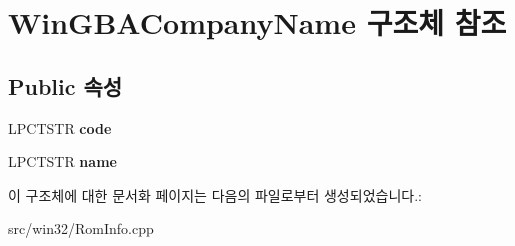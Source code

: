 \hypertarget{struct_win_g_b_a_company_name}{}\section{Win\+G\+B\+A\+Company\+Name 구조체 참조}
\label{struct_win_g_b_a_company_name}
\subsection*{Public 속성}
\begin{DoxyCompactItemize}
\item 
\mbox{\label{struct_win_g_b_a_company_name_a8c8a9f3a68535b96bae0b3c1734a1696}} 
L\+P\+C\+T\+S\+TR {\bfseries code}
\item 
\mbox{\label{struct_win_g_b_a_company_name_a61746fed679453b425013ae539c4c3a7}} 
L\+P\+C\+T\+S\+TR {\bfseries name}
\end{DoxyCompactItemize}


이 구조체에 대한 문서화 페이지는 다음의 파일로부터 생성되었습니다.\+:\begin{DoxyCompactItemize}
\item 
src/win32/Rom\+Info.\+cpp\end{DoxyCompactItemize}
